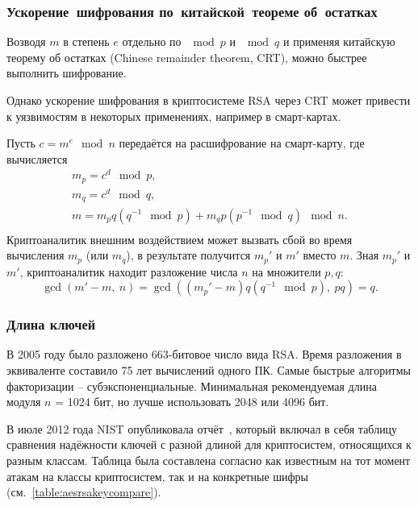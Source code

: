 

\subsubsection{Ускорение~шифрования по~китайской~теореме об~остатках}

Возводя $m$ в степень $e$ отдельно по $\mod p$ и $\mod q$ и применяя китайскую теорему об остатках (Chinese remainder theorem, CRT), можно быстрее выполнить шифрование.

Однако ускорение шифрования в криптосистеме RSA через CRT может привести к уязвимостям в некоторых применениях, например в смарт-картах.

\example
Пусть $c = m^e \mod n$ передаётся на расшифрование на смарт-карту, где вычисляется
\[ \begin{array}{c}
    m_p = c^d \mod p, \\
    m_q = c^d \mod q, \\
    m = m_p q (q^{-1} \mod p) + m_q p (p^{-1} \mod q) \mod n. \\
\end{array} \]
Криптоаналитик внешним воздействием может вызвать сбой во время вычисления $m_p$ (или $m_q$), в результате получится $m_p'$ и $m'$ вместо $m$. Зная $m_p'$ и $m'$, криптоаналитик находит разложение числа $n$ на множители $p,q$:
    \[ \gcd(m' - m, ~ n) = \gcd( (m_p' - m) q (q^{-1} \mod p), ~ pq) = q. \]
\exampleend


\subsubsection{Длина ключей}

В 2005 году было разложено 663-битовое число вида RSA. Время разложения в эквиваленте составило 75 лет вычислений одного ПК. Самые быстрые алгоритмы факторизации -- субэкспоненциальные. Минимальная рекомендуемая длина модуля $n$ = 1024 бит, но лучше использовать 2048 или 4096 бит.

В июле 2012 года NIST опубликовала отчёт~\cite{NIST:SP800:57}, который включал в себя таблицу сравнения надёжности ключей с разной длиной для криптосистем, относящихся к разным классам. Таблица была составлена согласно как известным на тот момент атакам на классы криптосистем, так и на конкретные шифры (см.~\ref{table:aesrsakeycompare}).
	
